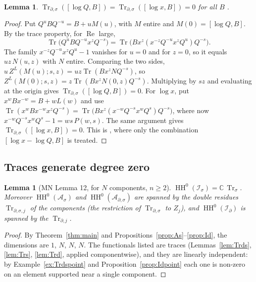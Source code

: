\documentclass[11pt,oneside,reqno]{article}
\DeclareMathOperator{\HH}{HH}
\DeclareMathOperator{\Tr}{Tr}
\newcommand{\C}{\mathbb C}
\newcommand{\Is}{\mathcal I_\sigma}
\newcommand{\Id}{\mathcal I_\partial}
\newcommand{\As}{\mathcal A_\sigma}
\newcommand{\Ads}{\mathcal A_{\partial,\sigma}}
\newcommand{\Trs}{\Tr_\sigma}
\newcommand{\Trds}{\Tr_{\partial,\sigma}}
\newcommand{\lQ}{\log Q}
\newcommand{\lx}{\log x}
\theoremstyle{plain}
\newtheorem{lemma}[theorem]{Lemma}
\theoremstyle{definition}
\theoremstyle{remark}
\begin{document}
\begin{lemma}\label{lem:TrdsD}
\(\Trds([\lQ,B])=\Trds([\lx,B])=0\) for all \(B\) \cite[(84)]{MN}.
\end{lemma}

\begin{proof}
Put \(Q^uBQ^{-u}=B+uM(u)\), with \(M\) entire and \(M(0)=[\lQ,B]\). By the
trace property, for \(\operatorname{Re}\) large,
\[
 \Tr\bigl(Q^uBQ^{-u}x^zQ^{-s}\bigr)=\Tr\bigl(Bx^z(x^{-z}Q^{-u}x^zQ^u)
 Q^{-s}\bigr).
\]
The family \(x^{-z}Q^{-u}x^zQ^u-1\) vanishes for \(u=0\) and for \(z=0\),
so it equals \(uz\,N(u,z)\) with \(N\) entire. Comparing the two sides,
\(u\,Z^L(M(u);s,z)=uz\Tr(Bx^zNQ^{-s})\), so
\(Z^L(M(0);s,z)=z\Tr(Bx^zN(0,z)Q^{-s})\). Multiplying by \(sz\) and
evaluating at the origin gives \(\Trds([\lQ,B])=0\). For \(\lx\), put
\(x^wBx^{-w}=B+wL(w)\) and use
\(\Tr(x^wBx^{-w}x^zQ^{-s})=\Tr\bigl(Bx^z(x^{-w}Q^{-s}x^wQ^s)Q^{-s}\bigr)\),
where now \(x^{-w}Q^{-s}x^wQ^s-1=ws\,P(w,s)\). The same argument gives
\(\Trds([\lx,B])=0\). This is \cite[(84)]{MN}, where only the combination
\([\lx-\lQ,B]\) is treated.
\end{proof}

\subsection{Traces generate degree zero}

\begin{lemma}[MN Lemma 12, for \(N\) components, \(n\ge2\)]\label{lem:HH0}
\(\HH^0(\Is)=\C\,\Trs\). Moreover \(\HH^0(\As)\) and \(\HH^0(\Ads)\) are
spanned by the double residues \(\Tr_{\partial,\sigma,j}\) of the
components (the restriction of \(\Trds\) to \(Z_j\)), and \(\HH^0(\Id)\)
is spanned by the \(\Tr_{\partial,j}\).
\end{lemma}

\begin{proof}
By Theorem~\ref{thm:main} and Propositions~\ref{prop:As}--\ref{prop:Id},
the dimensions are \(1\), \(N\), \(N\), \(N\). The functionals listed are
traces (Lemmas~\ref{lem:Trds}, \ref{lem:Trs}, \ref{lem:Trd}, applied
componentwise), and they are linearly independent: by
Example~\ref{ex:Trdspoint} and Proposition~\ref{prop:Idpoint} each one is
non-zero on an element supported near a single component.
\end{proof}
\end{document}
